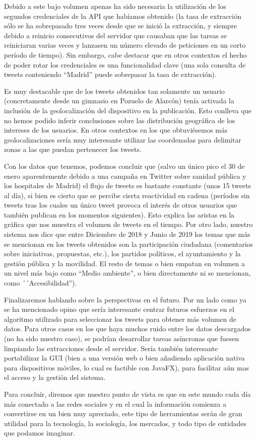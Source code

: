 Debido a este bajo volumen apenas ha sido necesaria la utilización de los segundos credenciales de la API que habíamos obtenido (la tasa de extracción sólo se ha sobrepasado tres veces desde que se inició la extracción, y siempre debido a reinicio consecutivos del servidor que causaban que las tareas se reiniciaran varias veces y lanzasen un número elevado de peticiones en un corto período de tiempo). Sin embargo, cabe destacar que en otros contextos el hecho de poder rotar los credenciales es una funcionalidad clave (una sola consulta de tweets conteniendo ``Madrid'' puede sobrepasar la tasa de extracción).

Es muy destacable que de los tweets obtenidos tan solamente un usuario (concretamente desde un gimnasio en Pozuelo de Alarcón) tenía activada la inclusión de la geolocalización del dispositivo en la publicación. Esto conlleva que no hemos podido inferir conclusiones sobre las distribución geográfica de los intereses de los usuarios. En otros contextos en los que obtuviésemos más geolocalizaciones sería muy interesante utilizar las coordenadas para delimitar zonas a las que puedan pertenecer los tweets.

Con los datos que tenemos, podemos concluir que (salvo un único pico el 30 de enero aparentemente debido a una campaña en Twitter sobre sanidad pública y los hospitales de Madrid) el flujo de tweets es bastante constante (unos 15 tweets al día), si bien es cierto que se percibe cierta reactividad en cadena (períodos sin tweets tras los cuales un único tweet provoca el interés de otros usuarios que también publican en los momentos siguientes). Esto explica las aristas en la gráfica que nos muestra el volumen de tweets en el tiempo. Por otro lado, nuestro sistema nos dice que entre Diciembre de 2018 y Junio de 2019 los temas que más se mencionan en los tweets obtenidos son la participación ciudadana (comentarios sobre iniciativas, propuestas, etc.), los partidos políticos, el ayuntamiento y la gestión pública y la movilidad. El resto de temas o bien empatan en volumen a un nivel más bajo como ``Medio ambiente'', o bien directamente ni se mencionan, como ´´Accesibilidad'').

Finalizaremos hablando sobre la perspectivas en el futuro. Por un lado como ya se ha mencionado opino que sería interesante centrar futuros esfuerzos en el algoritmo utilizado para seleccionar los tweets para obtener más volumen de datos. Para otros casos en los que haya muchos ruido entre los datos descargados (no ha sido nuestro caso), se podrían desarrollar tareas asíncronas que fuesen limpiando las extracciones desde el servidor. Sería también interesante portabilizar la GUI (bien a una versión web o bien añadiendo aplicación nativa para dispositivos móviles, lo cual es factible con JavaFX), para facilitar aún mas el acceso y la gestión del sistema.

Para concluír, diremos que nuestro punto de vista es que en este mundo cada día más conectado a las redes sociales y en el cual la información comienza a convertirse en un bien muy apreciado, este tipo de herramientas serán de gran utilidad para la tecnología, la sociología, los mercados, y todo tipo de entidades que podamos imaginar.